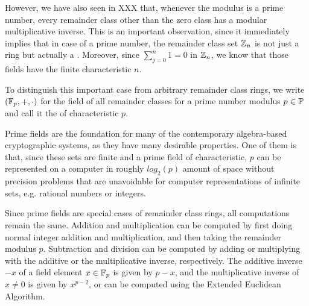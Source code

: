 However, we have also seen in XXX that, whenever the modulus is a prime number, every remainder class other than the zero class has a modular multiplicative inverse. This is an important observation, since it immediately implies that in case of a prime number, the remainder class set $\mathbb{Z}_n$ is not just a ring but actually a . Moreover, since $\sum_{j=0}^n 1 = 0$ in $\mathbb{Z}_n$, we know that those fields have the finite characteristic $n$.

To distinguish this important case from arbitrary remainder class rings, we write  $ (\mathbb{F}_p, +, \cdot) $ for the field of all remainder classes for a prime number modulus $p \in \mathbb{P}$ and call it the  of characteristic $p$.

Prime fields are the foundation for many of the contemporary algebra-based cryptographic systems, as they have many desirable properties. One of them is that, since these sets are finite and a prime field of characteristic, $p$ can be represented on a computer in roughly $log_2(p)$ amount of space without precision problems that are unavoidable for computer representations of infinite sets, e.g. rational numbers or integers.

Since prime fields are special cases of remainder class rings, all computations remain the same. Addition and multiplication can be computed by first doing normal integer addition and multiplication, and then taking the remainder modulus $p$. Subtraction and division can be computed by adding or multiplying with the additive or the multiplicative inverse, respectively. The additive inverse $-x$ of a field element $x\in\mathbb{F}_p$ is given by $p-x$, and the multiplicative inverse of $x\neq 0$ is given by $x^{p-2}$, or can be computed using the Extended Euclidean Algorithm.

